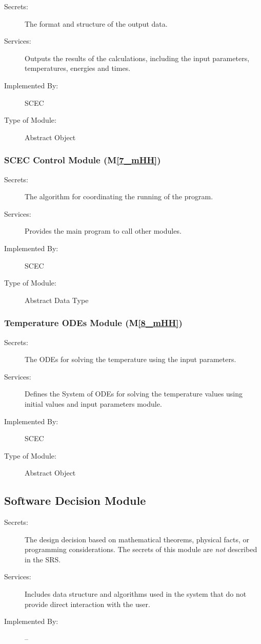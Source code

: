 \documentclass[12pt, titlepage]{article}
\newcommand{\mref}[1]{M\ref{#1}}
\begin{document}
\begin{description}
\item[Secrets:] The format and structure of the output data.
\item[Services:] Outputs the results of the calculations, including the input parameters, temperatures, energies and times.
\item[Implemented By:] SCEC
\item[Type of Module:] Abstract Object
\end{description}

\subsubsection{SCEC Control Module (\mref{7_mHH})}

\begin{description}
\item[Secrets:] The algorithm for coordinating the running of the program.
\item[Services:] Provides the main program to call other modules. 
\item[Implemented By:] SCEC
\item[Type of Module:] Abstract Data Type
\end{description}

\subsubsection{Temperature ODEs Module (\mref{8_mHH})}

\begin{description}
\item[Secrets:] The ODEs for solving the temperature using the input parameters.
\item[Services:] Defines the System of ODEs for solving the temperature values using initial values and input parameters module. 
\item[Implemented By:] SCEC
\item[Type of Module:] Abstract Object
\end{description}


\subsection{Software Decision Module}

\begin{description}
\item[Secrets:] The design decision based on mathematical theorems, physical
  facts, or programming considerations. The secrets of this module are
  \emph{not} described in the SRS.
\item[Services:] Includes data structure and algorithms used in the system that
  do not provide direct interaction with the user. 
\item[Implemented By:] --
\end{description}
\end{document}
